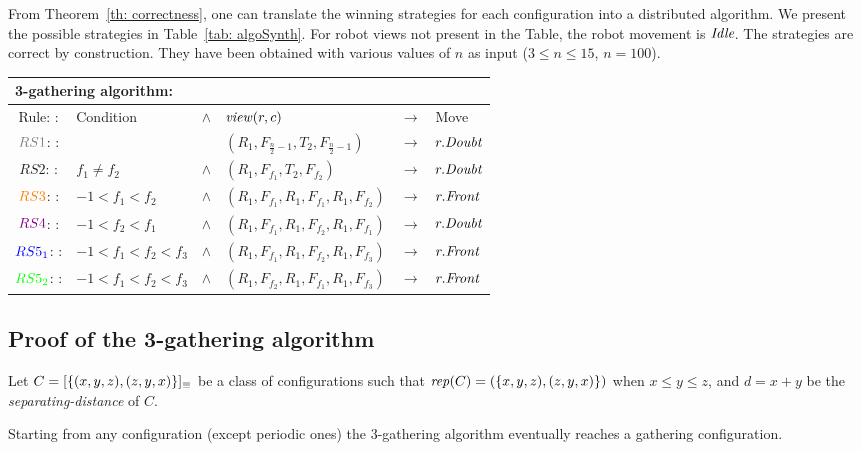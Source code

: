 From Theorem~\ref{th: correctness}, one can translate the winning strategies for each configuration
into a distributed algorithm.
We present the possible strategies in Table~\ref{tab: algoSynth}.
For robot views not present in the Table, the robot movement is $\textit{Idle}$. 
The strategies are correct by construction. They have been obtained with various values of $n$ as input ($3 \leq n  \leq 15$, $n = 100$). 

\begin{table*}[htbp]
\centering
\begin{tabular}{|c l c l c l|}
\hline
\multicolumn{6}{|l|}{\rule[0.1cm]{0cm}{0.25cm}  
\textbf{3-gathering algorithm:  }}
\\[1pt] \hline
Rule: :  & Condition & $\land$ & $\mathit{view}(r, c)$&$\rightarrow$&Move\\
\hline
$\textcolor{gray}{RS1}$: : & & &$(R_1, F_{\frac{n}{2}-1}, T_2, F_{\frac{n}{2}-1})$&$\rightarrow$&$r.\textit{Doubt}$\\
$RS2$: : & $f_1 \neq f_2$&$\wedge $&$(R_1, F_{f_1}, T_2, F_{f_2})$&$\rightarrow$&$r.\textit{Doubt}$\\
$\textcolor{orange}{RS3}$: : & $-1< f_1 < f_2$&$\wedge $&$(R_1, F_{f_1}, R_1, F_{f_1}, R_1, F_{f_2})$&$\rightarrow$&$r.\textit{Front}$\\
$\textcolor{violet}{RS4}$: : & $-1< f_2 < f_1$&$\wedge $&$(R_1, F_{f_1}, R_1, F_{f_2}, R_1, F_{f_1})$&$\rightarrow$&$r.\textit{Doubt}$\\
$\textcolor{blue}{RS5_1}$: : &$-1< f_1< f_2<f_3$&$\wedge $&$(R_1, F_{f_1}, R_1, F_{f_2}, R_1, F_{f_3})$&$\rightarrow$&$r.\textit{Front}$\\
$\textcolor{green}{RS5_2}$: : &$-1< f_1< f_2<f_3$&$\wedge $&$(R_1, F_{f_2}, R_1, F_{f_1}, R_1, F_{f_3})$&$\rightarrow$&$r.\textit{Front}$\\
\hline
\end{tabular}
\caption{Rules of the synthesized algorithm for a robot $r$}
\label{tab: algoSynth}
\end{table*}



\subsection{Proof of the 3-gathering algorithm}
\label{preuve2}
Let $C=[\{(x,y,z),(z,y,x)\}]_{\equiv}$ be a class of configurations such that $\mathit{rep}(C)= (\{x,y,z),(z,y,x)\})$ when $x \leq y \leq z$, and $d=x+y$ be the \emph{separating-distance} of $C$.


	\begin{theorem}
Starting from any configuration (except periodic ones) the 3-gathering algorithm %
eventually reaches a gathering configuration.
\end{theorem}

